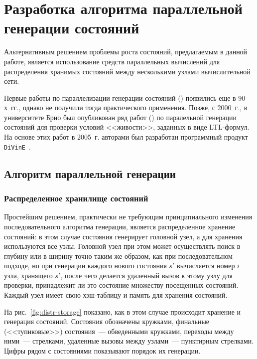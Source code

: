 \chapter{Разработка алгоритма параллельной генерации состояний}
\label{sec:par-statespace}

Альтернативным решением проблемы роста состояний, предлагаемым в данной работе, является
использование средств параллельных вычислений для распределения хранимых состояний между
несколькими узлами вычислительной сети.

Первые работы по параллелизации генерации состояний (\cite{LS99}) появились еще в
90-х~гг., однако не получили тогда практического применения. Позже, с 2000~г., в
университете Брно был опубликован ряд работ (\cite{DLTL1,DLTL2}) по паралельной
генерации состояний для проверки условий <<живости>>, заданных в виде LTL-формул. На
основе этих работ в 2005~г. авторами был разработан программный продукт
\texttt{DiVinE}~\cite{DiVinE}.

\section{Алгоритм параллельной генерации}
\label{sec:par-algo}

\subsection{Распределенное хранилище состояний}
\label{sec:distr-storage}

Простейшим решением, практически не требующим принципиального изменения последовательного
алгоритма генерации, является распределенное хранение состояний: в этом случае состояния
генерирует головной узел, а для хранения используются все узлы. Головной узел при этом
может осуществлять поиск в глубину или в ширину точно таким же образом, как при
последовательном подходе, но при генерации каждого нового состояния $s'$ вычисляется номер
$i$ узла, хранящего $s'$, после чего делается удаленный вызов к этому узлу для проверки,
принадлежит ли это состояние множеству  посещенных состояний. Каждый узел
имеет свою хэш-таблицу и память для хранения состояний.

На рис.~\ref{fig:distr-storage} показано, как в этом случае происходит хранение и
генерация состояний. Состояния обозначены кружками, финальные (<<тупиковые>>) состояния~---
обведенными кружками, переходы между ними~--- стрелками, удаленные вызовы между узлами~---
пунктирным стрелками. Цифры рядом с состояниями показывают порядок их генерации.

